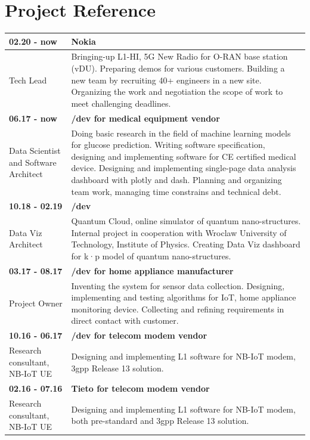 \documentclass{report}
\begin{document}
\section{Project Reference}
\begin{longtable}{p{5cm} p{10cm}}
    \textbf{02.20 - now} &\textbf{Nokia}\\
    \hline
    Tech Lead
    & Bringing-up L1-HI, 5G New Radio for O-RAN base station (vDU). Preparing demos for
    various customers. Building a new team by recruiting 40+ engineers in a new site.
    Organizing the work and negotiation the scope of work to meet challenging deadlines.\\

    \textbf{06.17 - now} &\textbf{/dev for medical equipment vendor}\\
    \hline
    Data Scientist and Software Architect
    & Doing basic research in the field of machine learning models for glucose prediction. Writing
    software specification, designing and implementing software for CE certified medical device. Designing
    and implementing single-page data analysis dashboard with plotly and dash. Planning and organizing
    team work, managing time constrains and technical debt.\\

    \textbf{10.18 - 02.19} &\textbf{/dev}\\
    \hline
    Data Viz Architect
    &Quantum Cloud, online simulator of quantum nano-structures.
    Internal project in cooperation with Wroclaw University of Technology, Institute of Physics.
    Creating Data Viz dashboard for k·p model of quantum nano-structures.\\
    \pagebreak
    \textbf{03.17 - 08.17} &\textbf{/dev for home appliance manufacturer}\\
    \hline
    Project Owner
    &Inventing the system for sensor data collection. Designing, implementing and testing algorithms
    for IoT, home appliance monitoring device. Collecting and refining requirements in direct contact
    with customer.\\

    \textbf{10.16 - 06.17} &\textbf{/dev for telecom modem vendor}\\
    \hline
    Research consultant, NB-IoT UE
    &Designing and implementing L1 software for NB-IoT modem, 3gpp Release 13 solution.\\

    \textbf{02.16 - 07.16} &\textbf{Tieto for telecom modem vendor}\\
    \hline
    Research consultant, NB-IoT UE
    &Designing and implementing L1 software for NB-IoT modem, both pre-standard and
    3gpp Release 13 solution.\\


\end{longtable}
\end{document}

